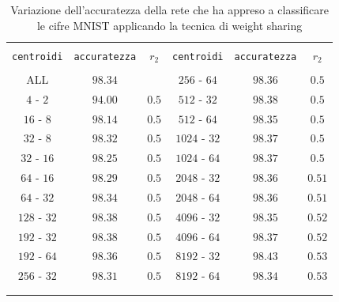 \documentclass[11pt,a4paper,twoside,
openright]{book}
\begin{document}
\begin{center}
\begin{table}[]
  \small
  \caption{Variazione dell'accuratezza della rete che ha appreso a classificare le cifre MNIST applicando la tecnica di weight sharing}\label{tab:tabwsmnist}
\begin{center}
\begin{tabular}{ccc|ccc}

\hline\\[-11pt]

\hline\\[-11pt]
\texttt{centroidi} & \texttt{accuratezza} & $r_2$ & \texttt{centroidi} & \texttt{accuratezza} & $r_2$ \\[1pt]
\hline\\[-6.5pt]
ALL          & $98.34$ &       & $256$ - $64$  & $98.36$ & $0.5$\\ 
$4$ - $2$    & $94.00$ & $0.5$ & $512$ - $32$  & $98.38$ & $0.5$\\   
$16$ - $8$   & $98.14$ & $0.5$ & $512$ - $64$  & $98.35$ & $0.5$\\ 
$32$ - $8$   & $98.32$ & $0.5$ & $1024$ - $32$ & $98.37$ & $0.5$\\   
$32$ - $16$  & $98.25$ & $0.5$ & $1024$ - $64$ & $98.37$ & $0.5$\\ 
$64$ - $16$  & $98.29$ & $0.5$ & $2048$ - $32$ & $98.36$ & $0.51$\\   
$64$ - $32$  & $98.34$ & $0.5$ & $2048$ - $64$ & $98.36$ & $0.51$\\ 
$128$ - $32$ & $98.38$ & $0.5$ & $4096$ - $32$ & $98.35$ & $0.52$\\  
$192$ - $32$ & $98.38$ & $0.5$ & $4096$ - $64$ & $98.37$ & $0.52$\\  
$192$ - $64$ & $98.36$ & $0.5$ & $8192$ - $32$ & $98.43$ & $0.53$\\
$256$ - $32$ & $98.31$ & $0.5$ & $8192$ - $64$ & $98.34$ & $0.53$\\  
\hline\\[-11pt]
\hline\\[-8pt]
\end{tabular}\\[5pt]
\end{center}
\normalsize
\end{table}
\end{center}
\end{document}
